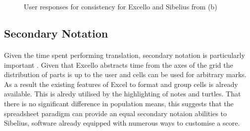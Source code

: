 \begin{figure}[tbh]
\caption{User responses for consistency for Excello and Sibelius from (b)}
\label{evaluation:cons}
\end{figure}

\subsection{Secondary Notation}

\paragraph{} Given the time spent performing translation, secondary notation is particularly important \cite{blackwell:notation}. Given that Excello abstracts time from the axes of the grid the distribution of parts is up to the user and cells can be used for arbitrary marks. As a result the existing features of Excel to format and group cells is already available. This is alredy utilised by the highlighting of notes and turtles. That there is no significant difference in population means, this suggests that the spreadsheet paradigm can provide an equal secondary notaion abilities to Sibelius, software already equipped with numerous ways to customise a score.

